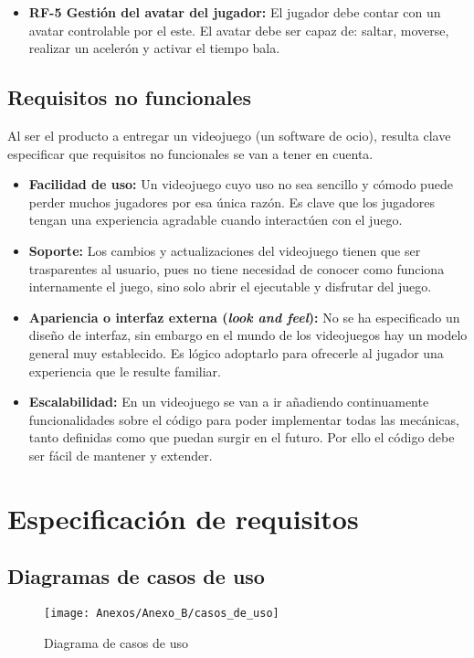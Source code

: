 \begin{itemize}
\item
\textbf{RF-5 Gestión del avatar del jugador:} El jugador debe contar con un avatar controlable por el este. El avatar debe ser capaz de: saltar, moverse, realizar un acelerón y activar el tiempo bala.
\end{itemize}

\subsection{Requisitos no funcionales}
Al ser el producto a entregar un videojuego (un software de ocio), resulta clave especificar que requisitos no funcionales se van a tener en cuenta.

\begin{itemize}
\item
\textbf{Facilidad de uso:} Un videojuego cuyo uso no sea sencillo y cómodo puede perder muchos jugadores por esa única razón. Es clave que los jugadores tengan una experiencia agradable cuando interactúen con el juego.

\item
\textbf{Soporte:} Los cambios y actualizaciones del videojuego tienen que ser trasparentes al usuario, pues no tiene necesidad de conocer como funciona internamente el juego, sino solo abrir el ejecutable y disfrutar del juego.

\item
\textbf{Apariencia o interfaz externa (\textit{look and feel}):} No se ha especificado un diseño de interfaz, sin embargo en el mundo de los videojuegos hay un modelo general muy establecido. Es lógico adoptarlo para ofrecerle al jugador una experiencia que le resulte familiar.

\item
\textbf{Escalabilidad:} En un videojuego se van a ir añadiendo continuamente funcionalidades sobre el código para poder implementar todas las mecánicas, tanto definidas como que puedan surgir en el futuro. Por ello el código debe ser fácil de mantener y extender.
\end{itemize}


\section{Especificación de requisitos}
\subsection{Diagramas de casos de uso}
\begin{figure}[h]
\centering
\texttt{[image: Anexos/Anexo\_B/casos\_de\_uso]}
\caption{Diagrama de casos de uso}
\end{figure}

